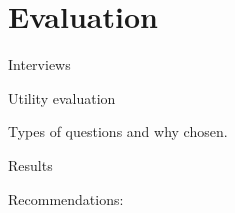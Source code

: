 \section{Evaluation}
\label{chap:evaluation}

Interviews

Utility evaluation

Types of questions and why chosen. \cite{Walker2013Qualitative}

Results


Recommendations:
\cite{Carver2001_PPGIS_Cyberdemocracy} 